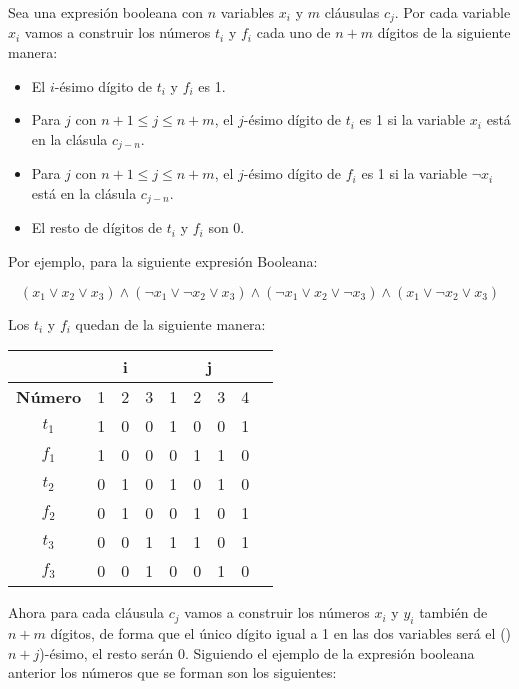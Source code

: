 \documentclass[11pt]{article}
\begin{document}
    Sea una expresión booleana con $n$ variables $x_i$ y $m$ cláusulas $c_j$. Por cada variable $x_i$ vamos
    a construir los números $t_i$ y $f_i$ cada uno de $n+m$ dígitos de la siguiente manera:

    \begin{itemize}
        \item El $i$-ésimo dígito de $t_i$ y $f_i$ es 1.
        \item Para $j$ con $n+1 \leq j \leq n+m$, el $j$-ésimo dígito de $t_i$ es 1 si la variable $x_i$ está
              en la clásula $c_{j-n}$.
        \item Para $j$ con $n+1 \leq j \leq n+m$, el $j$-ésimo dígito de $f_i$ es 1 si la variable $\neg x_i$ está
              en la clásula $c_{j-n}$.
        \item El resto de dígitos de $t_i$ y $f_i$ son 0.
    \end{itemize}

    \newpage

    Por ejemplo, para la siguiente expresión Booleana:

    \[
    (x_1 \vee x_2 \vee x_3) \wedge (\neg x_1 \vee \neg x_2 \vee x_3) \wedge (\neg x_1 \vee x_2 \vee \neg x_3)
    \wedge (x_1 \vee \neg x_2 \vee x_3)
    \]

    Los $t_i$ y $f_i$ quedan de la siguiente manera:


    \begin{table}[!h]
        \centering
        \begin{tabular}{|c|c|c|c|c|c|c|c|c|}
        \hline
        \multicolumn{1}{|c|}{} & \multicolumn{3}{c|}{\textbf{i}} & \multicolumn{4}{c|}{\textbf{j}} \\ \hline
        \textbf{Número} & 1 & 2 & 3 & 1 & 2 & 3 & 4 \\ \hline
        $t_1$ & 1 & 0 & 0 & 1 & 0 & 0 & 1 \\ \hline
        $f_1$ & 1 & 0 & 0 & 0 & 1 & 1 & 0 \\ \hline
        $t_2$ & 0 & 1 & 0 & 1 & 0 & 1 & 0 \\ \hline
        $f_2$ & 0 & 1 & 0 & 0 & 1 & 0 & 1 \\ \hline
        $t_3$ & 0 & 0 & 1 & 1 & 1 & 0 & 1 \\ \hline
        $f_3$ & 0 & 0 & 1 & 0 & 0 & 1 & 0 \\ \hline
        \end{tabular}
    \end{table}

    Ahora para cada cláusula $c_j$ vamos a construir los números $x_i$ y $y_i$ también de $n+m$ dígitos, de forma que
    el único dígito igual a 1 en las dos variables será el ()$n+j$)-ésimo, el resto serán 0. Siguiendo el ejemplo
    de la expresión booleana anterior los números que se forman son los siguientes:
\end{document}
